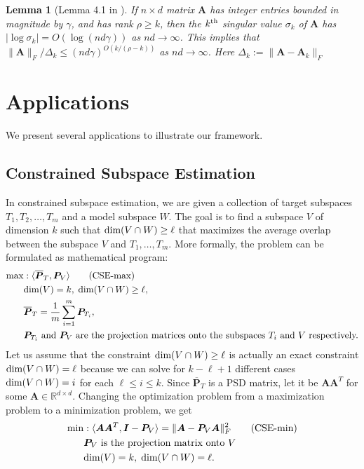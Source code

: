 \documentclass[11pt]{article}
\newcommand{\sumL}{\sum\limits}
\theoremstyle{plain}
\newtheorem{lemma}[theorem]{Lemma}
\theoremstyle{plain}
\theoremstyle{definition}
\theoremstyle{plain}
\theoremstyle{remark}
\newcommand{\RR}{\mathbb{R}}
\begin{document}
\begin{lemma}[Lemma 4.1 in \cite{Numercal_LinearAlgebra_Woodruff}]
\label{lemma:subspace_error_lb}
If $n\times d$ matrix $\bm{A}$ has integer entries bounded in magnitude by $\gamma$, and has rank $\rho\geq k$, then the $k^{\textnormal{th}}$ singular value $\sigma_k$ of $\bm{A}$ has $|\log \sigma_k|=O(\log(nd\gamma))$ as $nd\rightarrow \infty$. This implies that $\|\bm{A}\|_F/\Delta_k\leq (nd\gamma)^{O(k/(\rho-k))}$ as $nd\rightarrow \infty$. Here $\Delta_k:= \|\bm{A}-\bm{A}_k\|_F$
\end{lemma}

\section{Applications}

We present several applications to illustrate our framework.
\subsection{Constrained Subspace Estimation \cite{santamaria2017constrained}}\label{sec:subspace-estimation}

In constrained subspace estimation, we are given a collection  of target subspaces $T_1,T_2,\dots,T_m$ and a model subspace $W$. The goal is to find a subspace $V$ of dimension $k$ such that $\textnormal{dim}(V \cap W)\geq \ell$ that maximizes the average overlap between the subspace $V$ and $T_1,\dots,T_m$. More formally, the problem can be formulated as mathematical program:
\begin{align}
\label{prog:subspace_estimation_max}
    \max&: \langle \overline{\bm{P}}_T, \bm{P}_V\rangle \tag{CSE-max}\\
    &\textnormal{dim}(V)=k,\;\textnormal{dim}(V \cap W)\geq \ell, \\
    & \overline{\bm{P}}_T =\frac{1}{m}\sumL_{i=1}^m\bm{P}_{T
    _i},\\
    &\bm{P}_{T_i} \textnormal{ and } \bm{P}_V \textnormal{ are the projection matrices onto the subspaces } T_i \textnormal{ and } V \textnormal{ respectively.}
\end{align}
Let us assume that the constraint $\textnormal{dim}(V \cap W)\geq \ell$ is actually an exact constraint $\textnormal{dim}(V \cap W)= \ell$ because we can solve for $k-\ell+1$ different cases $\textnormal{dim}(V \cap W)= i$ for each $\ell \leq i\leq k$. Since $\overline{\bm{P}}_T$ is a PSD matrix, let it be $\bm{A}\bm{A}^T$ for some $\bm{A}\in \RR^{d\times d}$. Changing the optimization problem from a maximization problem to a minimization problem, we get
\begin{align}
\label{prog:subspace_estimation_min}
    \min&: \langle \bm{A}\bm{A}^T, \bm{I}-\bm{P}_V\rangle = \|\bm{A}-\bm{P}_{V}\bm{A}\|_F^2 \tag{CSE-min}\\
    &\bm{P}_V \textnormal{ is the projection matrix onto } V\\
     &\textnormal{dim}(V)=k,\; \textnormal{dim}(V \cap W)= \ell.
\end{align}
\end{document}
